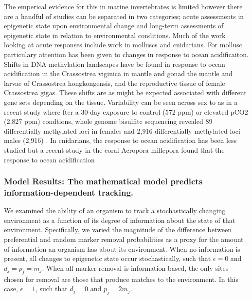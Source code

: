 \documentclass{article}
\begin{document}
The emperical evidence for this in marine invertebrates is limited however there are a handful of studies can be separated in two categories; acute assessments in epigenetic state upon environmental change and long-term assessments of epigenetic state in relation to environmental conditions. Much of the work looking at acute responses include work in molluscs and cnidarians. For mollusc particulary attention has been given to changes in response to ocean acidificaiton. Shifts in DNA methylation landscapes have be found in response to ocean acidification in the Crassostrea viginica in mantle \cite{10.3389/fmars.2020.566419} and gonad \cite{0.3389/fmars.2020.00225} the mantle \cite{10.1111/gcb.15675} and larvae \cite{10.1016/j.marenvres.2020.105217, 10.1111/mec.16751} of Crassostrea hongkongensis, and the reproductive tissue \cite{10.1186/s12864-022-08781-5} of female Crassostrea gigas. These shifts are as might be expected associated with different gene sets depending on the tissue. Variability can be seen across sex to as in a recent study where fter a 30-day exposure to control (572 ppm) or elevated pCO2 (2,827 ppm) condtions, whole genome bisulfite sequencing revealed 89 differentially methylated loci in females and 2,916 differentially methylated loci males (2,916) \cite{10.1101/2024.04.04.588108}. In cnidarians, the response to ocean acidification has been less studied but a recent study in the coral Acropora millepora found that the response to ocean acidification



\subsubsection{Model Results: The mathematical model predicts information-dependent tracking.}
We examined the ability of an organism to track a stochastically changing environment as a function of its degree of information about the state of that environment. Specifically, we varied the magnitude of the difference between preferential and random marker removal probabilities as a proxy for the amount of information an organism has about its environment. When no information is present, all changes to epigenetic state occur stochastically, such that $\epsilon = 0$ and $d_j = p_j = m_j$. When all marker removal is information-based, the only sites chosen for removal are those that produce matches to the environment. In this case, $\epsilon = 1$, such that $d_j = 0$ and $p_j = 2m_j$. 
\end{document}
